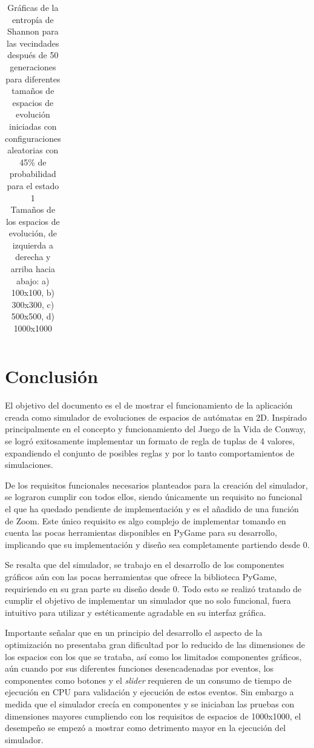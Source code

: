 \documentclass[]{article}
\begin{document}
\begin{table}[!h]
\begin{tabular}{c c}
				\end{tabular}
				\caption{Gráficas de la entropía de Shannon para las vecindades después de 50 generaciones para diferentes tamaños de espacios de evolución iniciadas con configuraciones aleatorias con 45\% de probabilidad para el estado 1\\ Tamaños de los espacios de evolución, de izquierda a derecha y arriba hacia abajo: a) 100x100, b) 300x300, c) 500x500, d) 1000x1000}
				\label{Entropia_graficas}
			\end{table}
		
\newpage
\section{Conclusión}
	El objetivo del documento es el de mostrar el funcionamiento de la aplicación creada como simulador de evoluciones de espacios de autómatas en 2D. Inspirado principalmente en el concepto y funcionamiento del Juego de la Vida de Conway, se logró exitosamente implementar un formato de regla de tuplas de 4 valores, expandiendo el conjunto de posibles reglas y por lo tanto comportamientos de simulaciones.
	
	De los requisitos funcionales necesarios planteados para la creación del simulador, se lograron cumplir con todos ellos, siendo únicamente un requisito no funcional el que ha quedado pendiente de implementación y es el añadido de una función de Zoom. Este único requisito es algo complejo de implementar tomando en cuenta las pocas herramientas disponibles en PyGame para su desarrollo, implicando que su implementación y diseño sea completamente partiendo desde 0.
	
	Se resalta que del simulador, se trabajo en el desarrollo de los componentes gráficos aún con las pocas herramientas que ofrece la biblioteca PyGame, requiriendo en su gran parte su diseño desde 0. Todo esto se realizó tratando de cumplir el objetivo de implementar un simulador que no solo funcional, fuera intuitivo para utilizar y estéticamente agradable en su interfaz gráfica.
	
	Importante señalar que en un principio del desarrollo el aspecto de la optimización no presentaba gran dificultad por lo reducido de las dimensiones de los espacios con los que se trataba, así como los limitados componentes gráficos, aún cuando por sus diferentes funciones desencadenadas por eventos, los componentes como botones y el \textit{slider} requieren de un consumo de tiempo de ejecución en CPU para validación y ejecución de estos eventos. Sin embargo a medida que el simulador crecía en componentes y se iniciaban las pruebas con dimensiones mayores cumpliendo con los requisitos de espacios de 1000x1000, el desempeño se empezó a mostrar como detrimento mayor en la ejecución del simulador. 
	
\end{document}
